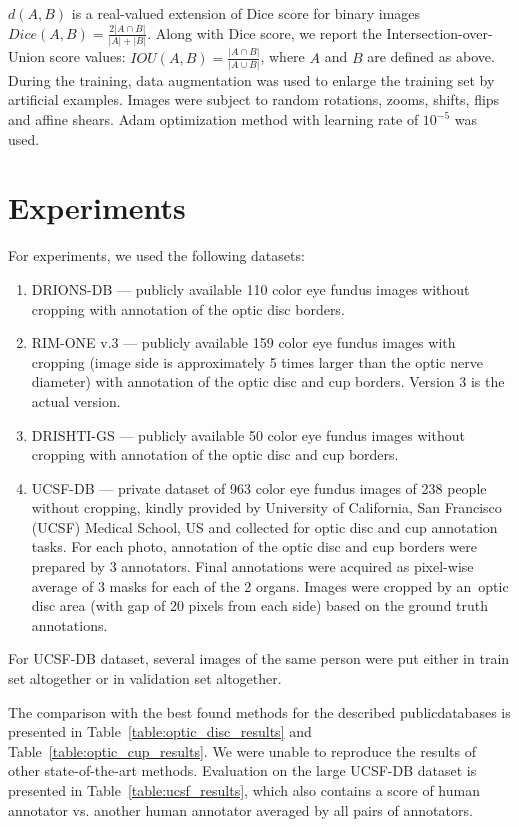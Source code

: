 \documentclass{llncs}
\begin{document}
$d(A, B)$ is a real-valued extension of Dice score for binary images $Dice(A, B) = \frac{2|A \cap B|}{|A| + |B|}$. Along with Dice score, we report the Intersection-over-Union score values: $IOU(A, B) = \frac{|A \cap B|}{|A \cup B|}$, where $A$ and $B$ are defined as above. During the training, data augmentation was used to enlarge the training set by artificial examples. Images were subject to random rotations, zooms, shifts, flips and affine shears. Adam optimization method with learning rate of $10^{-5}$ was used.


\section{Experiments}


For experiments, we used the following datasets:
\begin{enumerate}
\item DRIONS-DB \cite{drionsdb} --- publicly available 110 color eye fundus images without cropping with annotation of the optic disc borders.
\item RIM-ONE v.3 \cite{rimone} --- publicly available 159 color eye fundus images with cropping (image side is approximately 5 times larger than the optic nerve diameter) with annotation of the optic disc and cup borders. Version 3 is the actual version.
\item DRISHTI-GS \cite{drishtigs1,drishtigs2} --- publicly available 50 color eye fundus images without cropping with annotation of the optic disc and cup borders. 
\item UCSF-DB --- private dataset of 963 color eye fundus images of 238 people without cropping, kindly provided by University of California, San Francisco (UCSF) Medical School, US and collected for optic disc and cup annotation tasks. For each photo, annotation of the optic disc and cup borders were prepared by 3 annotators. Final annotations were acquired as pixel-wise average of 3 masks for each of the 2 organs. Images were cropped by an~optic disc area (with gap of 20 pixels from each side) based on the ground truth annotations.
\end{enumerate}


For UCSF-DB dataset, several images of the same person were put either in train set altogether or in validation set altogether.


The comparison with the best found methods for the described public\linebreak databases is presented in Table~\ref{table:optic_disc_results} and Table~\ref{table:optic_cup_results}. We were unable to reproduce the results of other state-of-the-art methods. Evaluation on the large UCSF-DB dataset is presented in Table~\ref{table:ucsf_results}, which also contains a score of human annotator vs. another human annotator averaged by all pairs of annotators.
\end{document}
